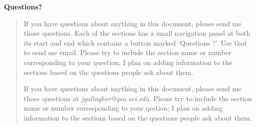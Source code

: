 
%
%

\small

\centerline{{\bf Questions?}} 

\begin{quotation}

\begin{htmlonly}
  If you have questions about anything in this document, please send me those
  questions. Each of the sections has a small navigation panel at both its
  start and end which contains a button marked `Questions ?'. Use that to
  send me email. Please try to include the section name or number
  corresponding to your question; I plan on adding information to the
  sections based on the questions people ask about them.
\end{htmlonly}

\begin{latexonly}
  If you have questions about anything in this document, please send me those
  questions at {\em jgallagher@gso.uri.edu}. Please try to include the
  section name or number corresponding to your qestion; I plan on adding
  information to the sections based on the questions people ask about them.
\end{latexonly}

\end{quotation}

\normalsize
